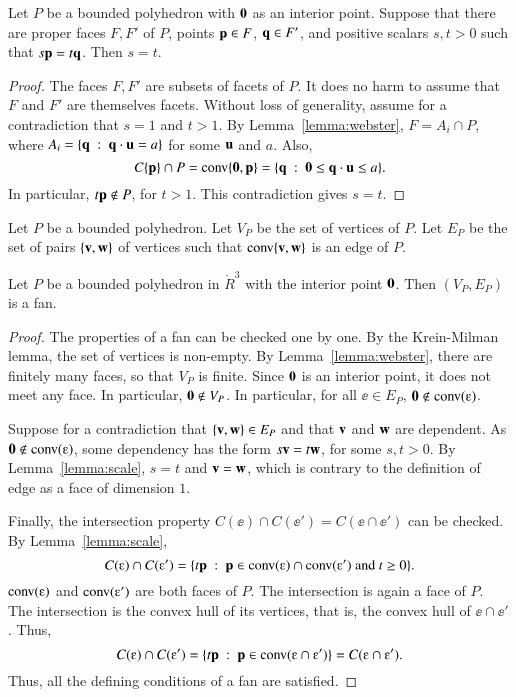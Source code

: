\begin{lemma} \label{lemma:scale} 
Let $P$ be a bounded polyhedron with ${\mathbf 0}$ as an interior point.  Suppose that there are proper faces $F,F'$ of $P$, points ${\mathbf p}\in F$, ${\mathbf q}\in F'$, and positive scalars $s,t >0$ such that $s {\mathbf p} = t {\mathbf q}$.  Then $s=t$.
\end{lemma}

\begin{proof}  The faces $F,F'$ are subsets of facets of $P$.  It does no harm to assume that $F$ and $F'$ are themselves facets.   Without loss of generality, assume for a contradiction that $s=1$ and $t>1$.  By Lemma~\ref{lemma:webster}, 
 $F = A_i \cap P$, where $A_i = \{{\mathbf q} \ :\  {\mathbf q}\cdot {\mathbf u} = a\}$ for some ${\mathbf u}$ and $a$.  Also, 
$$
C\{{\mathbf p}\}\cap P = {\operatorname{conv}}\{{\mathbf 0},{\mathbf p}\} = \{{\mathbf q} \ :\  {\mathbf 0}\le {\mathbf q}\cdot {\mathbf u} \le a\}.
$$
In particular, $t {\mathbf p}\not\in P$, for $t>1$.  This contradiction gives $s = t$.
\end{proof}





\begin{definition} Let $P$ be a bounded polyhedron.
Let $V_P$ be the set of vertices of $P$.  Let $E_P$ be the set of pairs $\{{\mathbf v},{\mathbf w}\}$ of vertices such that ${\operatorname{conv}}\{{\mathbf v},{\mathbf w}\}$ is an edge of $P$.
\end{definition}
%
%

\begin{lemma}\label{lemma:polyhedron}%
Let $P$ be a bounded polyhedron in $\ring{R}^3$ with the interior point ${\mathbf 0}$.
Then $(V_P,E_P)$ is a fan.
\end{lemma}
%

\begin{proof} The properties of a fan can be checked one by one.
By the Krein-Milman lemma, the set of vertices is non-empty.  By Lemma~\ref{lemma:webster}, there are finitely many faces, so that $V_P$ is finite.  Since ${\mathbf 0}$ is an interior point, it does not meet any face.  In particular, ${\mathbf 0}\not\in V_P$.   In particular,
for all $\ee\in E_P$, 
$\orz\not\in \op{conv}(\ee)$.

Suppose for a contradiction that $\{{\mathbf v},{\mathbf w}\}\in E_P$ and that ${\mathbf v}$ and ${\mathbf w}$ are dependent.  As $\orz\not\in \op{conv}(\ee)$, some dependency has the form $s {\mathbf v} = t {\mathbf w}$, for some $s, t>0$.  By Lemma~\ref{lemma:scale}, $s=t$ and ${\mathbf v}={\mathbf w}$, which is contrary to the definition of edge as a face of dimension $1$.

Finally, the intersection property $C(\ee)\cap C(\ee') = C(\ee \cap \ee')$ can be checked.
By Lemma~\ref{lemma:scale},
$$
C(\ee) \cap C(\ee') = \{t \p \mid \p\in \op{conv}(\ee) \cap \op{conv}(\ee') \text{ and } t \ge 0\}.
$$
$\op{conv}(\ee)$ and $\op{conv}(\ee')$ are both faces of $P$.  The intersection is again a face of $P$.  The intersection is the convex hull of its vertices, that is, the convex hull of $\ee \cap \ee'$.  Thus,
$$
C(\ee)\cap C(\ee') = \{t \p \mid \p\in \op{conv}(\ee\cap \ee')\} = C(\ee \cap \ee').
$$
Thus, all the defining conditions of a fan are satisfied.
\end{proof}


